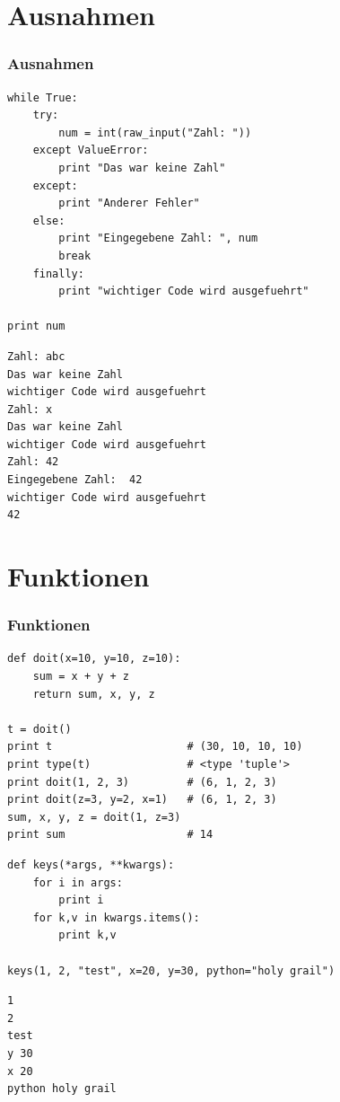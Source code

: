 \documentclass[10pt]{beamer}
\begin{document}
\section{Ausnahmen}
 \begin{frame}[fragile]
  \frametitle{Ausnahmen}
   \begin{lstlisting}
while True:
    try:
        num = int(raw_input("Zahl: "))
    except ValueError:
        print "Das war keine Zahl"
    except:
        print "Anderer Fehler"
    else:
        print "Eingegebene Zahl: ", num
        break
    finally:
        print "wichtiger Code wird ausgefuehrt"

print num
   \end{lstlisting}

   \begin{lstlisting}[style=SHELL]
Zahl: abc
Das war keine Zahl
wichtiger Code wird ausgefuehrt
Zahl: x
Das war keine Zahl
wichtiger Code wird ausgefuehrt
Zahl: 42
Eingegebene Zahl:  42
wichtiger Code wird ausgefuehrt
42   
   \end{lstlisting}

\end{frame}

\section{Funktionen}
\begin{frame}[fragile]
 \frametitle{Funktionen}
 \begin{lstlisting}
def doit(x=10, y=10, z=10):
    sum = x + y + z
    return sum, x, y, z

t = doit()
print t                     # (30, 10, 10, 10)
print type(t)               # <type 'tuple'>
print doit(1, 2, 3)         # (6, 1, 2, 3)
print doit(z=3, y=2, x=1)   # (6, 1, 2, 3)
sum, x, y, z = doit(1, z=3)
print sum                   # 14
\end{lstlisting}
\begin{lstlisting}
def keys(*args, **kwargs):
    for i in args:
        print i
    for k,v in kwargs.items():
        print k,v

keys(1, 2, "test", x=20, y=30, python="holy grail")
 \end{lstlisting}
\begin{lstlisting}[style=SHELL]
1
2
test
y 30
x 20
python holy grail
\end{lstlisting}

\end{frame}
\end{document}
